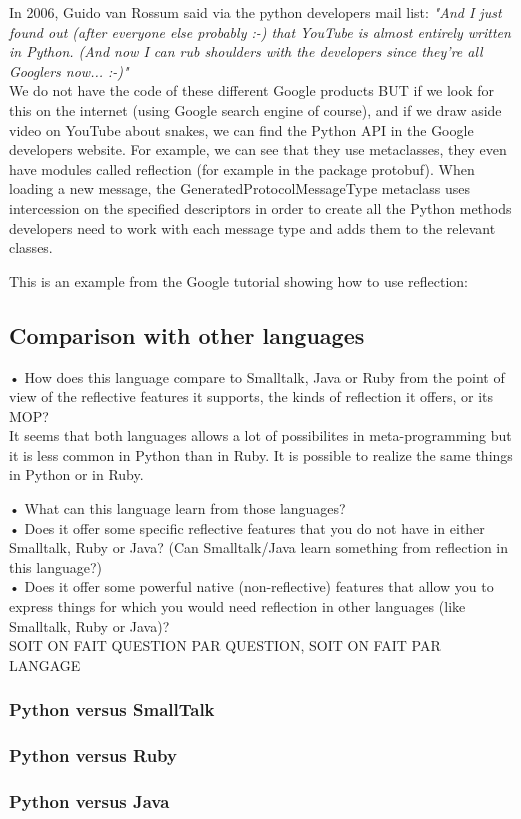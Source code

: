 In 2006, Guido van Rossum said via the python developers mail list:
\emph{"And I just found out (after everyone else probably :-) that YouTube is almost entirely written in Python. (And now I can rub shoulders with the developers since they're all Googlers now... :-)"}\\

We do not have the code of these different Google products BUT if we look for this on the internet (using Google search engine of course), and if we draw aside video on YouTube about snakes, we can find the Python API in the Google developers website. For example, we can see that they use metaclasses, they even have modules called reflection (for example in the package protobuf). When loading a new message, the GeneratedProtocolMessageType metaclass uses intercession on the specified descriptors in order to create all the Python methods developers need to work with each message type and adds them to the relevant classes. \cite{google_reflection_references, google_reflection_tutorial}

This is an example from the Google tutorial showing how to use reflection:



\subsection{Comparison with other languages}
•	How does this language compare to Smalltalk, Java or Ruby from the point of view of the reflective features it supports, the kinds of reflection it offers, or its MOP?\\
It seems that both languages allows a lot of possibilites in meta-programming but it is less common in Python than in Ruby. It is possible to realize the same things in Python or in Ruby.

•	What can this language learn from those languages?\\
•	Does it offer some specific reflective features that you do not have in either Smalltalk, Ruby or Java? (Can Smalltalk/Java learn something from reflection in this language?)\\
•	Does it offer some powerful native (non-reflective) features that allow you to express things for which you would need reflection in other languages (like Smalltalk, Ruby or Java)?\\

SOIT ON FAIT QUESTION PAR QUESTION, SOIT ON FAIT PAR LANGAGE
\subsubsection{Python versus SmallTalk}

\subsubsection{Python versus Ruby}

\subsubsection{Python versus Java}
